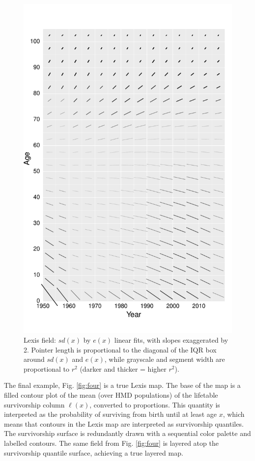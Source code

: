 \documentclass[10pt, twoside, parskip=half]{article}
\begin{document}
\begin{figure}[!t]

{\centering \includegraphics[width=0.8\linewidth]{Figures/FigApp2} 

}

\caption{Lexis field: \(sd(x)\) by \(e(x)\) linear fits, with slopes exaggerated by 2. Pointer length is proportional to the diagonal of the IQR box around \(sd(x)\) and \(e(x)\), while grayscale and segment width are proportional to \(r^2\) (darker and thicker = higher \(r^2\)).}\label{fig:three}
\end{figure}

The final example, Fig. \ref{fig:four} is a true Lexis map. The base of the map is a filled contour plot of the mean (over HMD populations) of the lifetable survivorship column \(\ell(x)\), converted to proportions. This quantity is interpreted as the probability of surviving from birth until at least age \(x\), which means that contours in the Lexis map are interpreted as survivorship quantiles. The survivorship surface is redundantly drawn with a sequential color palette and labelled contours. The same field from Fig. \ref{fig:four} is layered atop the survivorship quantile surface, achieving a true layered map.
\end{document}
